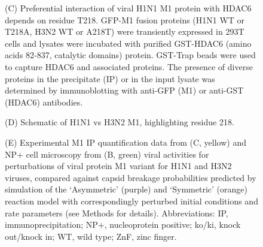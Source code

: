 \begin{figure}
\begin{center}
{(C) Preferential interaction of viral H1N1 M1 protein with HDAC6 depends on residue T218. GFP-M1 fusion proteins (H1N1 WT or T218A, H3N2 WT or A218T) were transiently expressed in 293T cells and lysates were incubated with purified GST-HDAC6 (amino acids 82-837, catalytic domains) protein. GST-Trap beads were used to capture HDAC6 and associated proteins. The presence of diverse proteins in the precipitate (IP) or in the input lysate was determined by immunoblotting with anti-GFP (M1) or anti-GST (HDAC6) antibodies.  \par
(D) Schematic of H1N1 vs H3N2 M1, highlighting residue 218. \par
(E) Experimental M1 IP quantification data from (C, yellow) and NP+ cell microscopy from (B, green) viral activities for perturbations of viral protein M1 variant for H1N1 and H3N2 viruses, compared against capsid breakage probabilities predicted by simulation of the ‘Asymmetric’ (purple) and ‘Symmetric’ (orange) reaction model with correspondingly perturbed initial conditions and rate parameters (see Methods for details). Abbreviations: IP, immunoprecipitation; NP+, nucleoprotein positive; ko/ki, knock out/knock in; WT, wild type; ZnF, zinc finger.
}
\label{figure:M1ReactionModel}
\end{center}
\end{figure}